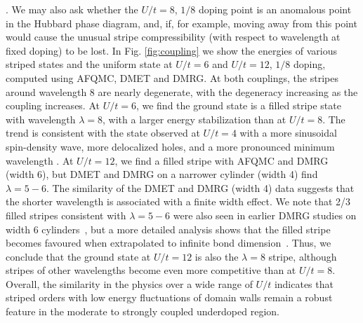 \documentclass[12pt]{article}
\begin{document}
. We may also ask whether the $U/t=8$, $1/8$ doping point 
is an anomalous point in the Hubbard phase diagram, and, if, for example, moving away from this
point would cause the unusual stripe compressibility (with respect to wavelength at fixed doping) to be lost. 
{In Fig. \ref{fig:coupling} we show
the energies of various striped states and the uniform state at $U/t=6$ and $U/t=12$, $1/8$ doping, computed using AFQMC, DMET and DMRG.
At both couplings, the stripes around wavelength 8 are nearly degenerate, with the degeneracy increasing as the
coupling increases. At $U/t=6$, we find the ground state is a filled stripe state with wavelength $\lambda = 8$, with a larger energy
stabilization than at $U/t=8$. The trend is consistent with the state observed at $U/t=4$ with a more sinusoidal spin-density wave, more delocalized holes, and a more pronounced
minimum wavelength \cite{chang2010spin}. At $U/t=12$, we find a filled stripe with AFQMC and
DMRG (width 6), but DMET and DMRG on a narrower cylinder (width 4) find $\lambda= 5-6$. The similarity of the DMET and DMRG (width 4) data
suggests that the shorter wavelength is associated with a finite width effect.
We note that 2/3 filled stripes consistent with $\lambda= 5-6$ were also seen in
earlier DMRG studies on width 6 cylinders~\cite{hager2005stripe}, but a more detailed analysis
shows that the filled stripe becomes favoured when extrapolated to infinite bond dimension~\cite{supplementary}.
Thus, we conclude that the ground state at $U/t=12$ is also the $\lambda=8$ stripe, although stripes of other wavelengths become
even more competitive than at $U/t=8$.
Overall, the similarity in the physics over a wide range of $U/t$ indicates that striped orders with low energy fluctuations of domain walls remain a robust feature in the moderate to strongly coupled underdoped region. 
}
\end{document}
